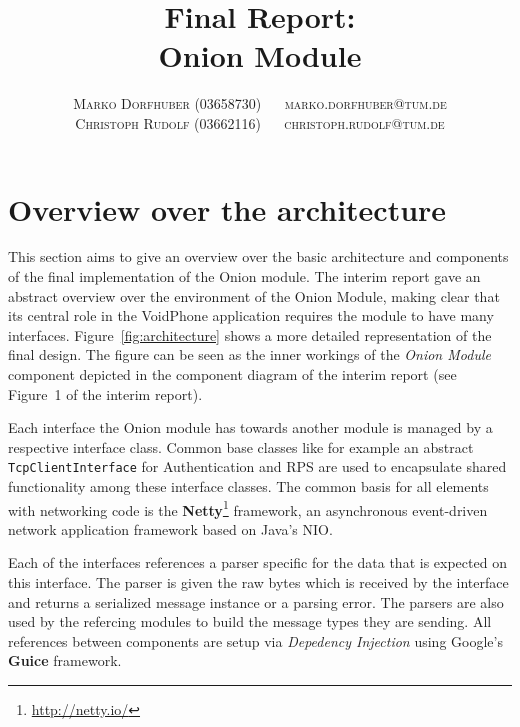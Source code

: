 \documentclass[paper=letter, fontsize=12pt]{article}
\title{\vspace{-15mm}\fontsize{24pt}{10pt}\selectfont\textbf{Final Report: \\Onion Module}} %
\author{
\large
{\textsc{Marko Dorfhuber (03658730) $\quad$ \Letter marko.dorfhuber@tum.de}}\\[2mm]
{\textsc{Christoph Rudolf (03662116) $\quad$ \Letter christoph.rudolf@tum.de}}\\[2mm]
}
\date{}
\begin{document}
\maketitle %
\thispagestyle{fancy} %

\section{Overview over the architecture}
This section aims to give an overview over the basic architecture and components of the final implementation of the Onion module.
The interim report gave an abstract overview over the environment of the Onion Module, making clear that its central role in the VoidPhone application requires the module to have many interfaces. Figure~\ref{fig:architecture} shows a more detailed representation of the final design. The figure can be seen as the inner workings of the \emph{Onion Module} component depicted in the component diagram of the interim report (see Figure~1 of the interim report). 

Each interface the Onion module has towards another module is managed by a respective interface class. Common base classes like for example an abstract \texttt{TcpClientInterface} for Authentication and RPS are used to encapsulate shared functionality among these interface classes. The common basis for all elements with networking code is the \textbf{Netty}\footnote{\url{http://netty.io/}} framework, an asynchronous event-driven network application framework based on Java's NIO. 

Each of the interfaces references a parser specific for the data that is expected on this interface. The parser is given the raw bytes which is received by the interface and returns a serialized message instance or a parsing error. The parsers are also used by the refercing modules to build the message types they are sending. All references between components are setup via \emph{Depedency Injection} using Google's \textbf{Guice} framework.
\end{document}
